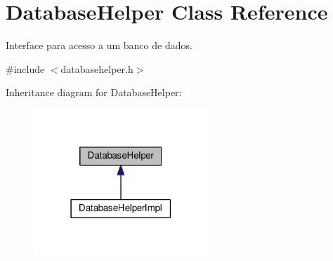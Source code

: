 \hypertarget{classDatabaseHelper}{}\section{Database\+Helper Class Reference}
\label{classDatabaseHelper}


Interface para acesso a um banco de dados.  




{\ttfamily \#include $<$databasehelper.\+h$>$}



Inheritance diagram for Database\+Helper\+:\nopagebreak
\begin{figure}[H]
\begin{center}
\leavevmode
\includegraphics[width=186pt]{d0/dc0/classDatabaseHelper__inherit__graph}
\end{center}
\end{figure}
